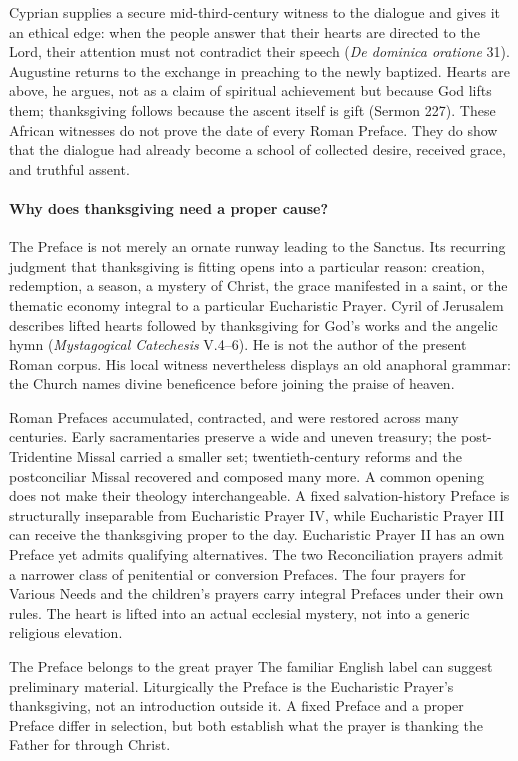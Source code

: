 Cyprian supplies a secure mid-third-century witness to the dialogue and gives it an ethical edge: when the people answer that their hearts are directed to the Lord, their attention must not contradict their speech (\emph{De dominica oratione} 31). Augustine returns to the exchange in preaching to the newly baptized. Hearts are above, he argues, not as a claim of spiritual achievement but because God lifts them; thanksgiving follows because the ascent itself is gift (Sermon 227). These African witnesses do not prove the date of every Roman Preface. They do show that the dialogue had already become a school of collected desire, received grace, and truthful assent.

\paragraph{Why does thanksgiving need a proper cause?}
The Preface is not merely an ornate runway leading to the Sanctus. Its recurring judgment that thanksgiving is fitting opens into a particular reason: creation, redemption, a season, a mystery of Christ, the grace manifested in a saint, or the thematic economy integral to a particular Eucharistic Prayer. Cyril of Jerusalem describes lifted hearts followed by thanksgiving for God's works and the angelic hymn (\emph{Mystagogical Catechesis} V.4--6). He is not the author of the present Roman corpus. His local witness nevertheless displays an old anaphoral grammar: the Church names divine beneficence before joining the praise of heaven.

Roman Prefaces accumulated, contracted, and were restored across many centuries. Early sacramentaries preserve a wide and uneven treasury; the post-Tridentine Missal carried a smaller set; twentieth-century reforms and the postconciliar Missal recovered and composed many more. A common opening does not make their theology interchangeable. A fixed salvation-history Preface is structurally inseparable from Eucharistic Prayer IV, while Eucharistic Prayer III can receive the thanksgiving proper to the day. Eucharistic Prayer II has an own Preface yet admits qualifying alternatives. The two Reconciliation prayers admit a narrower class of penitential or conversion Prefaces. The four prayers for Various Needs and the children's prayers carry integral Prefaces under their own rules. The heart is lifted into an actual ecclesial mystery, not into a generic religious elevation.

\begin{studybox}{The Preface belongs to the great prayer}
The familiar English label can suggest preliminary material. Liturgically the Preface is the Eucharistic Prayer's thanksgiving, not an introduction outside it. A fixed Preface and a proper Preface differ in selection, but both establish what the prayer is thanking the Father for through Christ.
\end{studybox}

